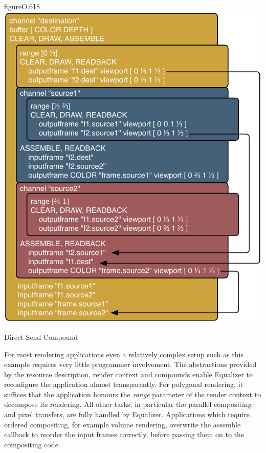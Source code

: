 \begin{wrapfloat}{figure}{O}{.618\textwidth}
  \includegraphics[width=.618\textwidth]{images/directSendCompound}
  {\caption{\label{fDirectSendCmp}Direct Send Compound}}
\end{wrapfloat}

For most rendering applications even a relatively complex setup such as this
example requires very little programmer involvement. The abstractions provided
by the resource description, render context and compounds enable Equalizer to
reconfigure the application almost transparently. For polygonal rendering, it
suffices that the application honours the {\em range} parameter of the render
context to decompose its rendering. All other tasks, in particular the parallel
compositing and pixel transfers, are fully handled by Equalizer. Applications
which require ordered compositing, for example volume rendering, overwrite the
assemble callback to reorder the input frames correctly, before passing them on
to the compositing code.

